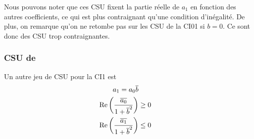       Nous pouvons noter que ces CSU fixent la partie réelle de \(a_1\) en fonction des autres coefficients, ce qui est plus contraignant qu'une condition d'inégalité. De plus, on remarque qu'on ne retombe pas sur les CSU de la CI01 si \(b=0\). Ce sont donc des CSU trop contraignantes.
    
    \subsubsection{CSU de \cite{stupfel_implementation_2015}}

      \begin{prop}
        Un autre jeu de CSU pour la CI1 est
        \begin{align}
          a_1 = a_0 {\overline{b}} \\
          \operatorname{Re}\left(\dfrac{{\overline{a_0}}}{1 + {\overline{b}}^2}\right) &\ge 0 \\
          \operatorname{Re}\left(\dfrac{{\overline{a_1}}}{1 + {\overline{b}}^2}\right) &\le 0
        \end{align}
      \end{prop}

